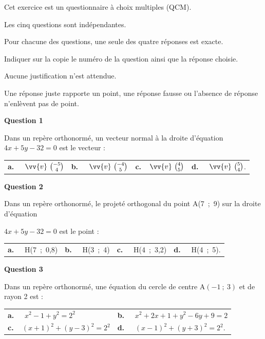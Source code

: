\medskip

Cet exercice est un questionnaire à choix multiples (QCM). 

Les cinq questions sont indépendantes.

 Pour chacune des questions, une seule des quatre réponses est exacte.
 
Indiquer sur la copie le numéro de la question ainsi que la réponse choisie.

 Aucune justification n’est attendue.
 
Une réponse juste rapporte un point, une réponse fausse ou l’absence de réponse n’enlèvent pas de point.

\medskip

\textbf{Question 1} 

\medskip 

Dans un repère orthonormé, un vecteur normal à la droite d’équation $4x+5y-32=0$ est le vecteur :

\medskip

\begin{tabularx}{\linewidth}{*{4}{X}}
\textbf{a.~~} $\vv{v}\ \binom{-5}{4} $ &\textbf{b.~~} $\vv{v}\ \binom{-4}{5} $&\textbf{c.~~}$\vv{v}\ \binom{4}{5} $& \textbf{d.~~} $\vv{v}\ \binom{5}{4}  $.
\end{tabularx}

\medskip

\textbf{Question 2}

\medskip 

Dans un repère orthonormé, le projeté orthogonal du point A(7~;~9) sur la droite d’équation 

$4x+5y-32=0$ est le point :

\medskip

\begin{tabularx}{\linewidth}{*{4}{X}}
\textbf{a.~~} H(7~;~0,8)  &\textbf{b.~~} H(3~;~4)&\textbf{c.~~} H(4~;~3,2) & \textbf{d.~~}  H(4~;~5).
\end{tabularx}

\medskip

\textbf{Question 3}

\medskip 

Dans un repère orthonormé, une équation du cercle de centre A$(-1~;~3)$ et de rayon 2 est :

\medskip

\begin{tabularx}{\linewidth}{*{2}{X}}
\textbf{a.~~} $ x^2-1+y^2=2^2 $ &\textbf{b.~~} $x^2+2x+1+y^2-6y+9=2 $\\\textbf{c.~~}$(x+1)^2+(y-3)^2=2^2 $& \textbf{d.~~} $(x-1)^2+(y+3)^2=2^2  $.
\end{tabularx}


